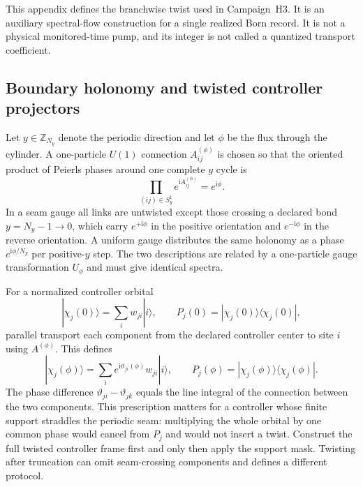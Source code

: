 \documentclass[aps,prx,twocolumn,floatfix,nofootinbib,superscriptaddress,longbibliography]{revtex4-2}
\newcommand{\ii}{\boldsymbol{\mathrm{i}}}
\begin{document}
This appendix defines the branchwise twist used in Campaign~H3.  It is an auxiliary
spectral-flow construction for a single realized Born record.  It is not a physical
monitored-time pump, and its integer is not called a quantized transport coefficient.

\subsection{Boundary holonomy and twisted controller projectors}

Let $y\in\mathbb Z_{N_y}$ denote the periodic direction and let $\phi$ be the flux through
the cylinder.  A one-particle $U(1)$ connection $A^{(\phi)}_{ij}$ is chosen so that the
oriented product of Peierls phases around one complete $y$ cycle is
\begin{equation}
 \prod_{(ij)\in S_y^1}e^{\ii A^{(\phi)}_{ij}}=e^{\ii\phi}.
 \label{eq:twist-holonomy}
\end{equation}
In a seam gauge all links are untwisted except those crossing a declared bond
$y=N_y-1\to0$, which carry $e^{+\ii\phi}$ in the positive orientation and
$e^{-\ii\phi}$ in the reverse orientation.  A uniform gauge distributes the same
holonomy as a phase $e^{\ii\phi/N_y}$ per positive-$y$ step.  The two descriptions are
related by a one-particle gauge transformation $U_\phi$ and must give identical spectra.

For a normalized controller orbital
\begin{equation}
 |\chi_j(0)\rangle=\sum_i w_{ji}|i\rangle,
 \qquad P_j(0)=|\chi_j(0)\rangle\langle\chi_j(0)|,
\end{equation}
parallel transport each component from the declared controller center to site $i$ using
$A^{(\phi)}$.  This defines
\begin{equation}
 |\chi_j(\phi)\rangle
 =\sum_i e^{\ii\vartheta_{ji}(\phi)}w_{ji}|i\rangle,
 \qquad
 P_j(\phi)=|\chi_j(\phi)\rangle\langle\chi_j(\phi)|.
 \label{eq:twisted-controller-projector}
\end{equation}
The phase difference $\vartheta_{ji}-\vartheta_{jk}$ equals the line integral of the
connection between the two components.  This prescription matters for a controller whose
finite support straddles the periodic seam: multiplying the whole orbital by one common
phase would cancel from $P_j$ and would not insert a twist.  Construct the full twisted
controller frame first and only then apply the support mask.  Twisting after truncation can
omit seam-crossing components and defines a different protocol.
\end{document}
